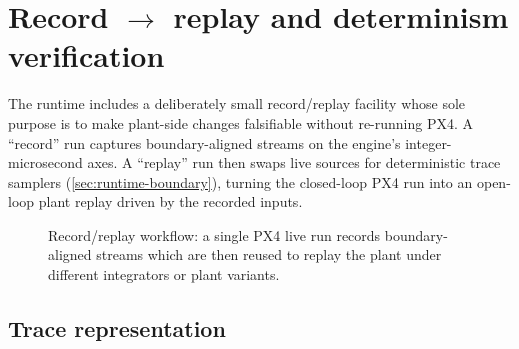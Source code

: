 \section{Record \texorpdfstring{$\to$}{->} replay and determinism verification}
\label{sec:record-replay}

The runtime includes a deliberately small record/replay facility whose sole purpose is to make plant-side changes falsifiable without re-running PX4. A ``record'' run captures boundary-aligned streams on the engine's integer-microsecond axes. A ``replay'' run then swaps live sources for deterministic trace samplers (\cref{sec:runtime-boundary}), turning the closed-loop PX4 run into an open-loop plant replay driven by the recorded inputs.

\begin{figure}[t]
  \centering
  \caption{Record/replay workflow: a single PX4 live run records boundary-aligned streams which are then reused to replay the plant under different integrators or plant variants.}
  \label{fig:record-replay-pipeline}
\end{figure}

\subsection{Trace representation}
\label{sec:trace-model}


